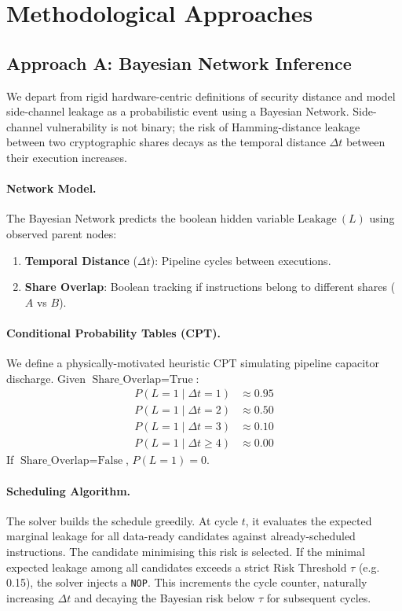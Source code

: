 \documentclass[letterpaper]{article}
\begin{document}
\section{Methodological Approaches}
\label{sec:methods}

\subsection{Approach A: Bayesian Network Inference}

We depart from rigid hardware-centric definitions of security distance and
model side-channel leakage as a probabilistic event using a Bayesian Network. Side-channel vulnerability is not binary; the risk
of Hamming-distance leakage between two cryptographic shares decays
as the temporal distance $\Delta t$ between their execution increases.

\paragraph{Network Model.}
The Bayesian Network predicts the boolean hidden variable $\text{Leakage}\ (L)$
using observed parent nodes:
\begin{enumerate}\setlength\itemsep{0pt}
  \item \textbf{Temporal Distance} ($\Delta t$): Pipeline cycles between executions.
  \item \textbf{Share Overlap}: Boolean tracking if instructions belong to different shares ($A$ vs $B$).
\end{enumerate}

\paragraph{Conditional Probability Tables (CPT).}
We define a physically-motivated heuristic CPT simulating pipeline capacitor discharge.
Given $\text{Share\_Overlap} = \text{True}$:
\begin{align*}
  P(L=1 \mid \Delta t=1)     & \approx 0.95 \\
  P(L=1 \mid \Delta t=2)     & \approx 0.50 \\
  P(L=1 \mid \Delta t=3)     & \approx 0.10 \\
  P(L=1 \mid \Delta t \ge 4) & \approx 0.00
\end{align*}
If $\text{Share\_Overlap} = \text{False}$, $P(L=1)=0$.

\paragraph{Scheduling Algorithm.}
The solver builds the schedule greedily. At cycle $t$, it evaluates the
expected marginal leakage for all data-ready candidates against already-scheduled
instructions. The candidate minimising this risk is selected. If the minimal
expected leakage among all candidates exceeds a strict Risk Threshold $\tau$ (e.g. 0.15),
the solver injects a \texttt{NOP}. This increments the cycle counter, naturally
increasing $\Delta t$ and decaying the Bayesian risk below $\tau$ for subsequent cycles.
\end{document}
